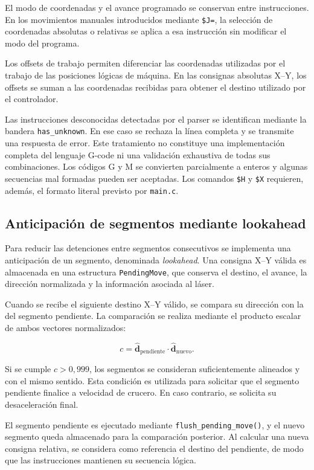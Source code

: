 \documentclass[blue,fullpaper]{ludusofficial}  %
\begin{document}
El modo de coordenadas y el avance programado se conservan
entre instrucciones. En los movimientos manuales
introducidos mediante \texttt{\$J=}, la selección
de coordenadas absolutas o relativas se aplica
a esa instrucción sin modificar el modo del programa.

Los offsets de trabajo permiten diferenciar las
coordenadas utilizadas por el trabajo de las posiciones
lógicas de máquina. En las consignas absolutas X--Y,
los offsets se suman a las coordenadas recibidas
para obtener el destino utilizado por el controlador.

Las instrucciones desconocidas detectadas por el parser
se identifican mediante la bandera \texttt{has\_unknown}.
En ese caso se rechaza la línea completa y se transmite
una respuesta de error. Este tratamiento no constituye
una implementación completa del lenguaje G-code ni
una validación exhaustiva de todas sus combinaciones. Los códigos G y M se convierten parcialmente a enteros y algunas secuencias mal formadas pueden ser aceptadas. Los comandos \texttt{\$H} y \texttt{\$X} requieren, además, el formato literal previsto por \texttt{main.c}.

\subsection{Anticipación de segmentos mediante lookahead}
\label{subsec:lookahead}

Para reducir las detenciones entre segmentos consecutivos
se implementa una anticipación de un segmento,
denominada \textit{lookahead}. Una consigna X--Y válida
es almacenada en una estructura \texttt{PendingMove},
que conserva el destino, el avance, la dirección
normalizada y la información asociada al láser.

Cuando se recibe el siguiente destino X--Y válido,
se compara su dirección con la del segmento pendiente.
La comparación se realiza mediante el producto escalar
de ambos vectores normalizados:

\[
c = \hat{\mathbf{d}}_{\mathrm{pendiente}}
    \cdot \hat{\mathbf{d}}_{\mathrm{nuevo}}.
\]

Si se cumple $c > 0{,}999$, los segmentos se consideran
suficientemente alineados y con el mismo sentido.
Esta condición es utilizada para solicitar que
el segmento pendiente finalice a velocidad de crucero.
En caso contrario, se solicita su desaceleración final.

El segmento pendiente es ejecutado mediante
\texttt{flush\_pending\_move()}, y el nuevo segmento
queda almacenado para la comparación posterior.
Al calcular una nueva consigna relativa, se considera
como referencia el destino del pendiente, de modo
que las instrucciones mantienen su secuencia lógica.
\end{document}

